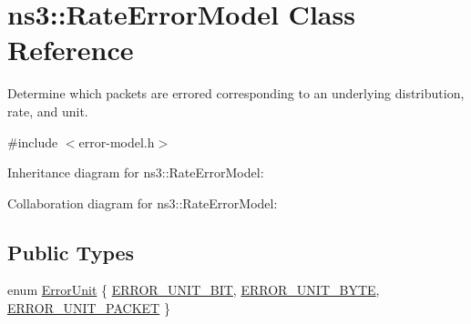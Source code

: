 \hypertarget{classns3_1_1RateErrorModel}{}\section{ns3\+:\+:Rate\+Error\+Model Class Reference}
\label{classns3_1_1RateErrorModel}


Determine which packets are errored corresponding to an underlying distribution, rate, and unit.  




{\ttfamily \#include $<$error-\/model.\+h$>$}



Inheritance diagram for ns3\+:\+:Rate\+Error\+Model\+:


Collaboration diagram for ns3\+:\+:Rate\+Error\+Model\+:
\subsection*{Public Types}
\begin{DoxyCompactItemize}
\item 
enum \hyperlink{classns3_1_1RateErrorModel_a4da336ba2dfcb55e0b7d7a3e7e713c02}{Error\+Unit} \{ \hyperlink{classns3_1_1RateErrorModel_a4da336ba2dfcb55e0b7d7a3e7e713c02a21e90acaf501051edf3a2465a1486e9a}{E\+R\+R\+O\+R\+\_\+\+U\+N\+I\+T\+\_\+\+B\+IT}, 
\hyperlink{classns3_1_1RateErrorModel_a4da336ba2dfcb55e0b7d7a3e7e713c02a1ca371d9e108b4891a0fc4f567508db3}{E\+R\+R\+O\+R\+\_\+\+U\+N\+I\+T\+\_\+\+B\+Y\+TE}, 
\hyperlink{classns3_1_1RateErrorModel_a4da336ba2dfcb55e0b7d7a3e7e713c02aca366c7aebdc8be8b2ea287a7d3643a3}{E\+R\+R\+O\+R\+\_\+\+U\+N\+I\+T\+\_\+\+P\+A\+C\+K\+ET}
 \}
\end{DoxyCompactItemize}
